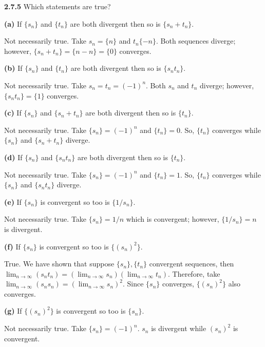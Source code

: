 \documentclass[12pt]{article}
\begin{document}
\begin{problem}\textbf{2.7.5}
Which statements are true?
\end{problem}
\begin{subproblem}\textbf{(a)}
If $\{s_n\}$ and $\{t_n\}$ are both divergent then so is $\{s_n+t_n\}$.
\end{subproblem}
\begin{solution}
Not necessarily true. Take $s_n=\{n\}$ and $t_n\{-n\}$. Both sequences diverge; however, $\{s_n+t_n\}=\{n-n\}=\{0\}$ converges.
\end{solution}
\begin{subproblem}\textbf{(b)}
If $\{s_n\}$ and $\{t_n\}$ are both divergent then so is $\{s_nt_n\}$.
\end{subproblem}
\begin{solution}
Not necessarily true. Take $s_n=t_n=(-1)^n$. Both $s_n$ and $t_n$ diverge; however, $\{s_nt_n\}=\{1\}$ converges. 
\end{solution}
\begin{subproblem}\textbf{(c)}
If $\{s_n\}$ and $\{s_n+t_n\}$ are both divergent then so is $\{t_n\}$.
\end{subproblem}
\begin{solution}
Not necessarily true. Take $\{s_n\}=(-1)^n$ and $\{t_n\}={0}$. So, $\{t_n\}$ converges while $\{s_n\}$ and $\{s_n+t_n\}$ diverge.
\end{solution}
\begin{subproblem}\textbf{(d)}
If $\{s_n\}$ and $\{s_nt_n\}$ are both divergent then so is $\{t_n\}$.
\end{subproblem}
\begin{solution}
Not necessarily true. Take $\{s_n\}=(-1)^n$ and $\{t_n\}={1}$. So, $\{t_n\}$ converges while $\{s_n\}$ and $\{s_nt_n\}$ diverge.
\end{solution}
\begin{subproblem}\textbf{(e)}
If $\{s_n\}$ is convergent so too is $\{1/s_n\}$.
\end{subproblem}
\begin{solution}
Not necessarily true. Take $\{s_n\}=1/n$ which is convergent; however, $\{1/s_n\}=n$ is divergent.
\end{solution}
\begin{subproblem}\textbf{(f)}
If $\{s_n\}$ is convergent so too is $\{(s_n)^2\}$.
\end{subproblem}
\begin{solution}
True.\newline
We have shown that suppose $\{s_n\},\{t_n\}$ convergent sequences, then $\lim_{n\to\infty}(s_nt_n)=(\lim_{n\to\infty}s_n)(\lim_{n\to\infty}t_n)$.\newline
Therefore, take $\lim_{n\to\infty}(s_ns_n)=(\lim_{n\to\infty}s_n)^2$.\newline
Since $\{s_n\}$ converges, $\{(s_n)^2\}$ also converges.
\end{solution}\begin{subproblem}\textbf{(g)}
If $\{(s_n)^2\}$ is convergent so too is $\{s_n\}$.
\end{subproblem}
\begin{solution}
Not necessarily true. Take $\{s_n\}=(-1)^n$. $s_n$ is divergent while $(s_n)^2$ is convergent.
\end{solution}
\end{document}
